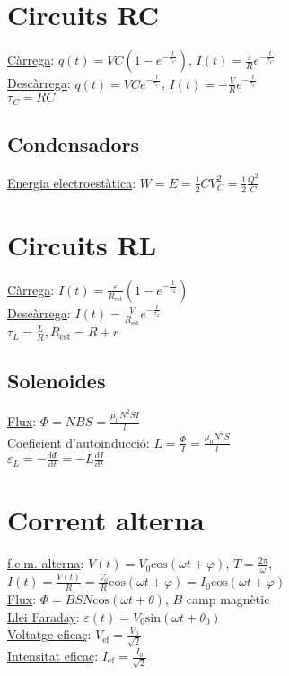 \documentclass[12pt]{article}
\begin{document}
\begin{multicols}{5}

\section{Circuits RC}

\underline{Càrrega}: $q(t) = VC\left( 1 - e^{-\frac{t}{\tau_C}}\right)$, $I(t) = \frac{\varepsilon}{R} e^{-\frac{t}{\tau_C}}$ \\
\underline{Descàrrega}: $q(t) = VCe^{-\frac{t}{\tau_C}}$, $I(t) = -\frac{V}{R}e^{-\frac{t}{\tau_C}}$ \\

$\tau_C = RC$
\subsection{Condensadors}

\underline{Energia electroestàtica}: $W = E = \frac{1}{2}CV_C^2 = \frac{1}{2}\frac{Q^2}{C}$

\section{Circuits RL}
\underline{Càrrega}: $I(t) = \frac{\varepsilon}{R_{\text{est}}} \left(1 - e^{-\frac{t}{\tau_L}}\right)$ \\
\underline{Descàrrega}: $I(t) = \frac{V}{R_{\text{est}}}e^{-\frac{t}{\tau_L}}$ \\
$\tau_L = \frac{L}{R}, R_{\text{est}} = R + r$

\subsection{Solenoides}

\underline{Flux}: $\Phi = NBS = \frac{\mu_0 N^2SI}{l}$ \\
\underline{Coeficient d'autoinducció}: $L = \frac{\Phi}{I} = \frac{\mu_0N^2S}{l}$ \\
$\varepsilon_L= -\frac{\text{d}\Phi}{\text{d}t} = -L \frac{\text{d}I}{\text{d}t}$

\section{Corrent alterna}

\underline{f.e.m. alterna}: $V(t) = V_0\text{cos}(\omega t+\varphi)$, $T = \frac{2\pi}{\omega}$, $I(t) = \frac{V(t)}{R} = \frac{V_0}{R}\text{cos}(\omega t + \varphi) = I_0\text{cos}(\omega t + \varphi)$ \\
\underline{Flux}: $\Phi = BSN\text{cos}(\omega t+\theta)$, $B$ camp magnètic \\
\underline{Llei Faraday}: $\varepsilon(t) = V_0\text{sin}(\omega t + \theta_0)$ \\
\underline{Voltatge eficaç}: $V_{\text{ef}} = \frac{V_0}{\sqrt{2}}$ \\
\underline{Intensitat eficaç}: $I_{\text{ef}} = \frac{I_0}{\sqrt{2}}$


\end{multicols}
\end{document}
